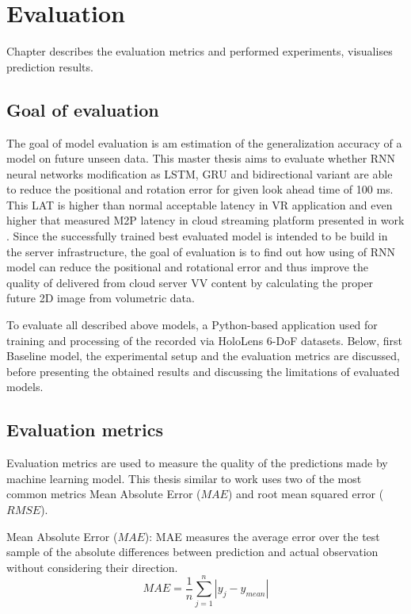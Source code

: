 
\chapter{Evaluation}
\label{sec:eval}
Chapter describes the evaluation metrics and performed experiments, visualises prediction results.

\section{Goal of evaluation}
\label{sec:eval:goal}
The goal of model evaluation is am estimation of the generalization accuracy of a model on future unseen data. This master thesis aims to evaluate whether RNN neural networks modification as LSTM, GRU and bidirectional variant are able to reduce the positional and rotation error for given look ahead time of 100 ms. This LAT is higher than normal acceptable latency in VR application and even higher that measured M2P latency in cloud streaming platform presented in work \cite{serhan_cloud_streaming}. Since the successfully trained best evaluated model is intended to be build in the server infrastructure, the goal of evaluation is to find out how using of RNN model can reduce the positional and rotational error and thus improve the quality of delivered from cloud server VV content by calculating the proper future 2D image from volumetric data.  

To evaluate all described above models, a Python-based application used for training and processing of the recorded via HoloLens 6-DoF datasets. Below, first Baseline model, the experimental setup and the evaluation metrics are discussed, before presenting the obtained results and discussing the limitations of evaluated models.

\section{Evaluation metrics}
\label{sec:eval:metrics}
Evaluation metrics are used to measure the quality of the predictions made by machine learning model. This thesis similar to work \cite{serhan_kalman} uses two of the most common metrics Mean Absolute Error ($MAE$) and root mean squared error ($RMSE$).

Mean Absolute Error ($MAE$): MAE measures the average error over the test sample of the absolute differences between prediction and actual observation without considering their direction. 
\begin{equation}
MAE= \frac{1}{n} \sum_{j=1}^{n} |y_j - y_{mean}|
\end{equation}

